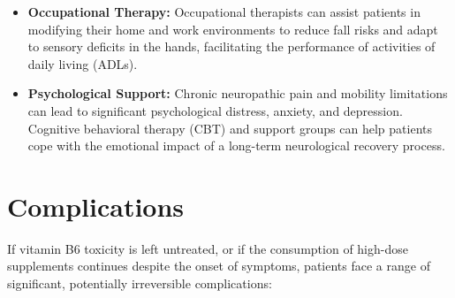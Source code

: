 \begin{itemize}
\begin{itemize}
    \end{itemize}
    \item \textbf{Occupational Therapy:} Occupational therapists can assist patients in modifying their home and work environments to reduce fall risks and adapt to sensory deficits in the hands, facilitating the performance of activities of daily living (ADLs).
    \item \textbf{Psychological Support:} Chronic neuropathic pain and mobility limitations can lead to significant psychological distress, anxiety, and depression. Cognitive behavioral therapy (CBT) and support groups can help patients cope with the emotional impact of a long-term neurological recovery process.
\end{itemize}

\section*{Complications}
If vitamin B6 toxicity is left untreated, or if the consumption of high-dose supplements continues despite the onset of symptoms, patients face a range of significant, potentially irreversible complications:

